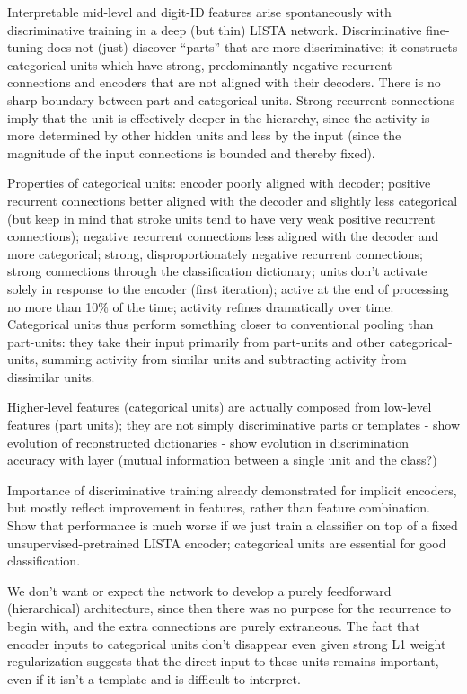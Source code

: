 Interpretable mid-level and digit-ID features arise spontaneously with discriminative training in a deep (but thin) LISTA network.  Discriminative fine-tuning does not (just) discover ``parts'' that are more discriminative; it constructs categorical units which have strong, predominantly negative recurrent connections and encoders that are not aligned with their decoders.  There is no sharp boundary between part and categorical units.  Strong recurrent connections imply that the unit is effectively deeper in the hierarchy, since the activity is more determined by other hidden units and less by the input (since the magnitude of the input connections is bounded and thereby fixed).

Properties of categorical units: encoder poorly aligned with decoder; positive recurrent connections better aligned with the decoder and slightly less categorical (but keep in mind that stroke units tend to have very weak positive recurrent connections); negative recurrent connections less aligned with the decoder and more categorical; strong, disproportionately negative recurrent connections; strong connections through the classification dictionary; units don't activate solely in response to the encoder (first iteration); active at the end of processing no more than 10\% of the time; activity refines dramatically over time.  Categorical units thus perform something closer to conventional pooling than part-units: they take their input primarily from part-units and other categorical-units, summing activity from similar units and subtracting activity from dissimilar units.  

Higher-level features (categorical units) are actually composed from low-level features (part units); they are not simply discriminative parts or templates
  - show evolution of reconstructed dictionaries
  - show evolution in discrimination accuracy with layer (mutual information between a single unit and the class?)

Importance of discriminative training already demonstrated for implicit encoders, but mostly reflect improvement in features, rather than feature combination.  Show that performance is much worse if we just train a classifier on top of a fixed unsupervised-pretrained LISTA encoder; categorical units are essential for good classification.  
 
We don't want or expect the network to develop a purely feedforward (hierarchical) architecture, since then there was no purpose for the recurrence to begin with, and the extra connections are purely extraneous.  The fact that encoder inputs to categorical units don't disappear even given strong L1 weight regularization suggests that the direct input to these units remains important, even if it isn't a template and is difficult to interpret.



